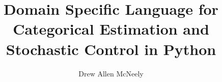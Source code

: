 \documentclass{article}
\begin{document}
\title{Domain Specific Language for Categorical Estimation and Stochastic Control in Python}
\author{Drew Allen McNeely}
\maketitle

\end{document}

